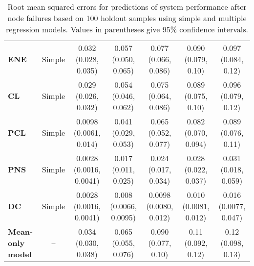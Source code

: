 \begin{landscape}
\begin{table}[!hp]
\begin{tabular}{lcccccc}
\textbf{ENE} & Simple & 0.032 (0.028, 0.035) & 0.057 (0.050, 0.065) & 0.077 (0.066, 0.086) & 0.090 (0.079, 0.10) & 0.097 (0.084, 0.12) \\ 
\textbf{CL} & Simple & 0.029 (0.026, 0.032) & 0.054 (0.046, 0.062) & 0.075 (0.064, 0.086) & 0.089 (0.075, 0.10) & 0.096 (0.079, 0.12) \\ 
\textbf{PCL} & Simple & 0.0098 (0.0061, 0.014) & 0.041 (0.029, 0.053) & 0.065 (0.052, 0.077) & 0.082 (0.070, 0.094) & 0.089 (0.076, 0.11) \\ 
\textbf{PNS} & Simple & 0.0028 (0.0016, 0.0041) & 0.017 (0.011, 0.025) & 0.024 (0.017, 0.034) & 0.028 (0.022, 0.037) & 0.031 (0.018, 0.059) \\ 
\textbf{DC} & Simple & 0.0028 (0.0016, 0.0041) & 0.008 (0.0066, 0.0095) & 0.0098 (0.0080, 0.012) & 0.010 (0.0081, 0.012) & 0.016 (0.0077, 0.047) \\ 
\textbf{Mean-only model} & -- & 0.034 (0.030, 0.038) & 0.065 (0.055, 0.076) & 0.090 (0.077, 0.10) & 0.11 (0.092, 0.12) & 0.12 (0.098, 0.13) \\ 

\bottomrule

\end{tabular}

\caption[Root mean squared errors for predictions of system performance after node failures.]{\label{tab:ch3:errorNodes}Root mean squared errors for predictions of system performance after node failures based on 100 holdout samples using simple and multiple regression models. Values in parentheses give 95\% confidence intervals.}

\end{table}
\vspace*{\fill}
\end{landscape}


